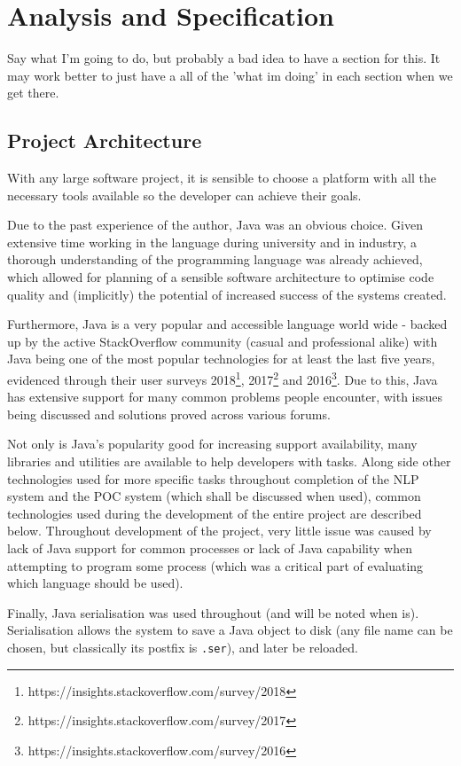 \chapter{Analysis and Specification}
Say what I'm going to do, but probably a bad idea to have a section for this. It may work better to just have a all of the 'what im doing' in each section when we get there.

\section{Project Architecture}
With any large software project, it is sensible to choose a platform with all the necessary tools available so the developer can achieve their goals. 

Due to the past experience of the author, Java was an obvious choice. Given extensive time working in the language during university and in industry, a thorough understanding of the programming language was already achieved, which allowed for planning of a sensible software architecture to optimise code quality and (implicitly) the potential of increased success of the systems created. 

Furthermore, Java is a very popular and accessible language world wide - backed up by the active StackOverflow community (casual and professional alike) with Java being one of the most popular technologies for at least the last five years, evidenced through their user surveys 2018\footnote{https://insights.stackoverflow.com/survey/2018}, 2017\footnote{https://insights.stackoverflow.com/survey/2017} and 2016\footnote{https://insights.stackoverflow.com/survey/2016}. Due to this, Java has extensive support for many common problems people encounter, with issues being discussed and solutions proved across various forums. 

Not only is Java's popularity good for increasing support availability, many libraries and utilities are available to help developers with tasks. Along side other technologies used for more specific tasks throughout completion of the NLP system and the POC system (which shall be discussed when used), common technologies used during the development of the entire project are described below. Throughout development of the project, very little issue was caused by lack of Java support for common processes or lack of Java capability when attempting to program some process (which was a critical part of evaluating which language should be used). 

Finally, Java serialisation was used throughout (and will be noted when is). Serialisation allows the system to save a Java object to disk (any file name can be chosen, but classically its postfix is \texttt{.ser}), and later be reloaded. 

